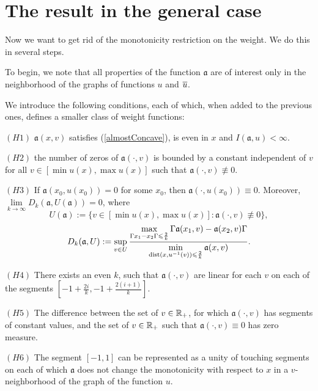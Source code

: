 \section{The result in the general case}
\label{moveForth}

Now we want to get rid of the monotonicity restriction on the weight.
We do this in several steps.

To begin, we note that all properties of the function $\mathfrak a$ are of interest
only in the neighborhood of the graphs of functions $u$ and $\mon{u}$.

We introduce the following conditions, each of which, when added to the previous ones, defines a smaller class of weight functions:

\bigskip

\smallskip
\noindent
$(H1)$ $\mathfrak a(x, v)$ satisfies (\ref{almostConcave}), is even in $x$ and $I(\mathfrak a, u) < \infty$.
\smallskip

\bigskip
\noindent
$(H2)$ the number of zeros of $\mathfrak a(\cdot, v)$ is bounded by a constant independent of $v$
for all $v \in [\min u(x), \max u(x)]$ such that $\mathfrak a(\cdot, v) \not \equiv 0$.

\bigskip
\noindent
$(H3)$ If $\mathfrak a(x_0, u(x_0)) = 0$ for some $x_0$, then $\mathfrak a(\cdot, u(x_0)) \equiv 0$.
Moreover, $\lim\limits_{k \to \infty} D_k(\mathfrak a, U(\mathfrak a)) = 0$, where
$$U(\mathfrak a) := \{ v \in [\min u(x), \max u(x)]: \mathfrak a(\cdot, v) \not \equiv 0 \},$$
\begin{equation}
\label{bigD}
D_k(\mathfrak a, U): = \sup \limits_{v \in U}
\frac{\max \limits_{\abs{x_1 - x_2} \le \frac{2}{k}} \abs{\mathfrak a(x_1, v) - \mathfrak a(x_2, v)}}
{\min \limits_{\dist (x, u^{-1} (v)) \le \frac{2}{k}} \mathfrak a(x, v)}.
\end{equation}

\bigskip
\noindent
$(H4)$ There exists an even $k$, such that $\mathfrak a(\cdot, v)$ are linear for each $v$ on each of the segments
$[-1 + \frac{2i}{k}, -1 + \frac{2(i + 1)}{k}]$.

\bigskip
\noindent
$(H5)$ The difference between the
set of $v \in \mathbb R_+$, for which $\mathfrak a(\cdot, v)$ has segments of constant values,
and the set of $v \in \mathbb R_+$ such that $\mathfrak a(\cdot, v) \equiv 0$
has zero measure.

\bigskip
\noindent
$(H6)$ The segment $[-1, 1]$ can be represented as a unity of touching segments
on each of which $\mathfrak a$ does not change the monotonicity with respect to $x$ in a $v$-neighborhood of the graph of the function $u$.

